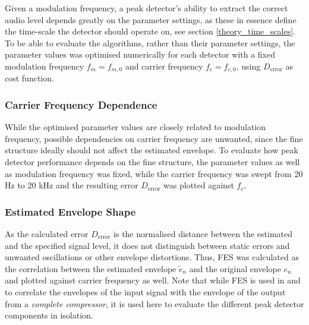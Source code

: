 \documentclass[../main2.tex]{subfiles}
\begin{document}
Given a modulation frequency, a peak detector's ability to extract the correct audio level depends greatly on the parameter settings, as these in essence define the time-scale the detector should operate on, see section \ref{theory_time_scales}. To be able to evaluate the algorithms, rather than their parameter settings, the parameter values was optimised numerically for each detector with a fixed modulation frequency $f_m = f_{m,0}$ and carrier frequency $f_c = f_{c,0}$, using $D_\text{error}$ as cost function.

\subsubsection{Carrier Frequency Dependence}
While the optimised parameter values are closely related to modulation frequency, possible dependencies on carrier frequency are unwanted, since the fine structure ideally should not affect the estimated envelope. To evaluate how peak detector performance depends on the fine structure, the parameter values as well as modulation frequency was fixed, while the carrier frequency was swept from 20 Hz to 20 kHz and the resulting error $D_\text{error}$ was plotted against $f_c$.

\subsubsection{Estimated Envelope Shape}
As the calculated error $D_\text{error}$ is the normalised distance between the estimated and the specified signal level, it does not distinguish between static errors and unwanted oscillations or other envelope distortions. Thus, FES was calculated as the correlation between the estimated envelope $\tilde{e}_n$ and the original envelope $e_n$ and plotted against carrier frequency as well. Note that while FES is used in \cite{stone1992syllabic}\cite{stone2007quantifying} and \cite{reiss2012tutorial} to correlate the envelopes of the input signal with the envelope of the output from a \emph{complete compressor}, it is used here to evaluate the different peak detector components in isolation. 
\end{document}

